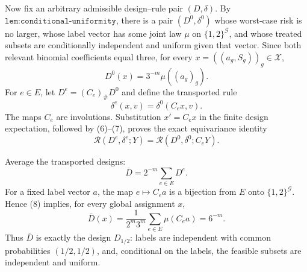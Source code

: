 Now fix an arbitrary admissible design--rule pair \((D,\delta)\).  By
\(\texttt{lem:conditional-uniformity}\), there is a pair
\((D^0,\delta^0)\) whose worst-case risk is no larger, whose label vector
has some joint law \(\mu\) on \(\{1,2\}^{\mathcal G}\), and whose treated
subsets are conditionally independent and uniform given that vector.
Since both relevant binomial coefficients equal three, for every
\(x=((a_g,S_g))_g\in\mathcal X\),
\[
 D^0(x)=3^{-m}\mu((a_g)_g).                                         \tag{8}
\]
For \(e\in E\), let \(D^e=(C_e)_\#D^0\) and define the transported rule
\[
 \delta^e(x,v)=\delta^0(C_ex,v).                                    \tag{9}
\]
The maps \(C_e\) are involutions.  Substitution \(x'=C_ex\) in the finite
design expectation, followed by (6)--(7), proves the exact equivariance
identity
\[
 \mathcal R(D^e,\delta^e;Y)
   =\mathcal R(D^0,\delta^0;C_eY).                                  \tag{10}
\]

Average the transported designs:
\[
 \overline D=2^{-m}\sum_{e\in E}D^e.                               \tag{11}
\]
For a fixed label vector \(a\), the map \(e\mapsto C_ea\) is a bijection
from \(E\) onto \(\{1,2\}^{\mathcal G}\).  Hence (8) implies, for every
global assignment \(x\),
\[
 \overline D(x)
 =\frac{1}{2^m3^m}\sum_{e\in E}\mu(C_ea)
 =6^{-m}.                                                           \tag{12}
\]
Thus \(\overline D\) is exactly the design \(D_{1/2}\): labels are
independent with common probabilities \((1/2,1/2)\), and, conditional on
the labels, the feasible subsets are independent and uniform.

